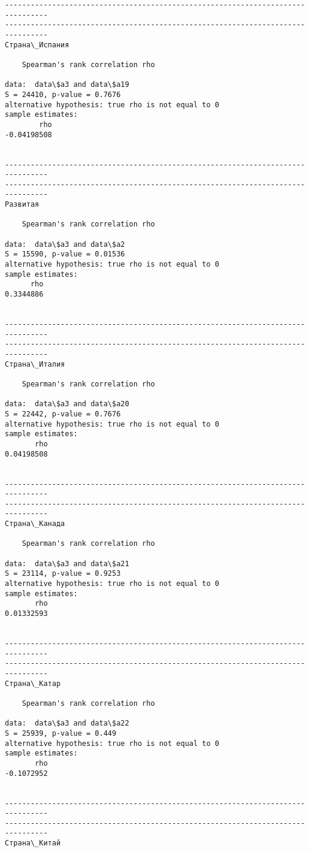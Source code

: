 \documentclass[11pt,mathletters]{article}
\begin{document}
\begin{Verbatim}[commandchars=\\\{\}]
--------------------------------------------------------------------------------
--------------------------------------------------------------------------------
Страна\_Испания

	Spearman's rank correlation rho

data:  data\$a3 and data\$a19
S = 24410, p-value = 0.7676
alternative hypothesis: true rho is not equal to 0
sample estimates:
        rho 
-0.04198508 


--------------------------------------------------------------------------------
--------------------------------------------------------------------------------
Развитая

	Spearman's rank correlation rho

data:  data\$a3 and data\$a2
S = 15590, p-value = 0.01536
alternative hypothesis: true rho is not equal to 0
sample estimates:
      rho 
0.3344886 


--------------------------------------------------------------------------------
--------------------------------------------------------------------------------
Страна\_Италия

	Spearman's rank correlation rho

data:  data\$a3 and data\$a20
S = 22442, p-value = 0.7676
alternative hypothesis: true rho is not equal to 0
sample estimates:
       rho 
0.04198508 


--------------------------------------------------------------------------------
--------------------------------------------------------------------------------
Страна\_Канада

	Spearman's rank correlation rho

data:  data\$a3 and data\$a21
S = 23114, p-value = 0.9253
alternative hypothesis: true rho is not equal to 0
sample estimates:
       rho 
0.01332593 


--------------------------------------------------------------------------------
--------------------------------------------------------------------------------
Страна\_Катар

	Spearman's rank correlation rho

data:  data\$a3 and data\$a22
S = 25939, p-value = 0.449
alternative hypothesis: true rho is not equal to 0
sample estimates:
       rho 
-0.1072952 


--------------------------------------------------------------------------------
--------------------------------------------------------------------------------
Страна\_Китай


\end{Verbatim}
\end{document}
